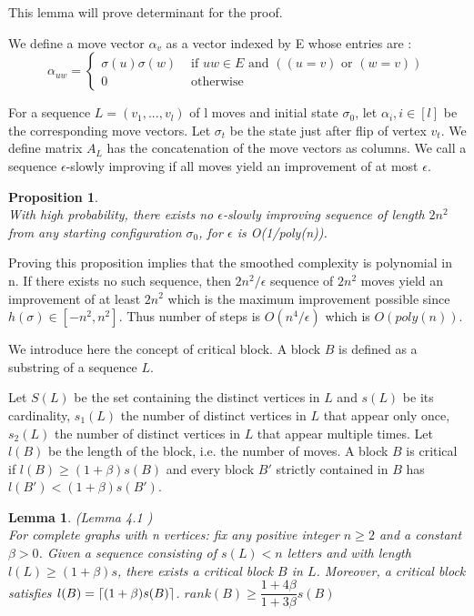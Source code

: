 \documentclass[12pt]{article}
\newtheorem{lemma}[theorem]{Lemma}
\newtheorem{proposition}[theorem]{Proposition}
\DeclarePairedDelimiter{\ceil}{\lceil}{\rceil}
\begin{document}
This lemma will prove determinant for the proof. 

We define a move vector $\alpha_v$ as a vector indexed by E whose entries are :
\begin{equation*}
\alpha_{uw} = 
\begin{cases}
\sigma(u)\sigma(w) &\text{ if } uw \in E \text{ and }( (u = v) \text{ or } (w = v)) \\
 0 &\text{ otherwise}
 \end{cases}
\end{equation*} 

For a sequence $L = (v_1, ..., v_l)$ of l moves and initial state $\sigma_0$, let $\alpha_i, i \in [l]$ be the corresponding move vectors. Let $\sigma_t$ be the state just after flip of vertex $v_t$. We define matrix $A_L$ has the concatenation of the move vectors as columns. We call a sequence $\epsilon$-slowly improving if all moves yield an improvement of at most $\epsilon$.

\begin{proposition}
\label{prop} \leavevmode \\
With high probability, there exists no $\epsilon$-slowly improving sequence of length $2n^2$ from any starting configuration $\sigma_0$, for $\epsilon$ is O(1/poly(n)).
\end{proposition}

Proving this proposition implies that the smoothed complexity is polynomial in n. If there exists no such sequence, then $2n^2/\epsilon$ sequence of $2n^2$ moves yield an improvement of at least $2n^2$ which is the maximum improvement possible since $h(\sigma) \in [-n^2,n^2]$. Thus number of steps is $O(n^4/\epsilon)$ which is $O(poly(n))$.

We introduce here the concept of critical block. A block $B$ is defined as a substring of a sequence $L$.

Let $S(L)$ be the set containing the distinct vertices in $L$ and $s(L)$ be its cardinality, $s_1(L)$ the number of distinct vertices in $L$ that appear only once, $s_2(L)$ the number of distinct vertices in $L$ that appear multiple times. Let $l(B)$ be the length of the block, i.e. the number of moves.
A block $B$ is critical if $l(B) \geq (1 + \beta)s(B)$ and every block $B'$ strictly contained in $B$ has $l(B') < (1+\beta)s(B')$.

\begin{lemma}
\label{critical}
(Lemma 4.1 \cite{angel2016local}) \\
For complete graphs with n vertices: fix any positive integer $n \geq 2$ and a constant $\beta > 0$. Given a sequence consisting of $s(L) < n$ letters and with length $l(L) \geq (1 +\beta)s$, there exists a critical block $B$ in $L$. Moreover, a critical block satisfies $l(B) = \ceil{(1 + \beta)s(B)}$.
$rank(B) \geq \dfrac{1+4\beta}{1 + 3\beta}s(B)$
\end{lemma} 
\end{document}
